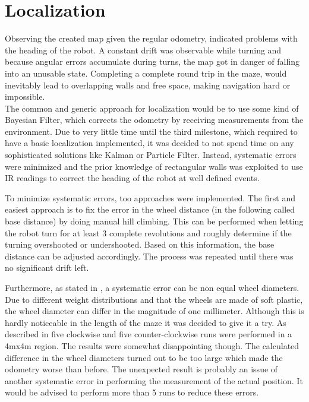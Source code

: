 \section{Localization}

Observing the created map given the regular odometry, indicated problems with the heading of the robot.
A constant drift was observable while turning and because angular errors accumulate during turns,
the map got in danger of falling into an unusable state.
Completing a complete round trip in the maze, would inevitably lead to overlapping walls and free space,
making navigation hard or impossible.\\

The common and generic approach for localization would be to use some kind of Bayesian Filter,
which corrects the odometry by receiving measurements from the environment.
Due to very little time until the third milestone, which required to have a basic localization implemented,
it was decided to not spend time on any sophisticated solutions like Kalman or Particle Filter.
Instead, systematic errors were minimized and the prior knowledge of rectangular walls was exploited to use IR readings to correct
the heading of the robot at well defined events.

To minimize systematic errors, too approaches were implemented.
The first and easiest approach is to fix the error in the wheel distance (in the following called base distance) by doing manual hill climbing.
This can be performed when letting the robot turn for at least 3 complete revolutions and roughly determine if the turning overshooted or undershooted.
Based on this information, the base distance can be adjusted accordingly.
The process was repeated until there was no significant drift left.

Furthermore, as stated in \cite{OdomCorr}, a systematic error can be non equal wheel diameters.
Due to different weight distributions and that the wheels are made of soft plastic, 
the wheel diameter can differ in the magnitude of one millimeter. 
Although this is hardly noticeable in the length of the maze it was decided to give it a try.
As described in \cite{OdomCorr} five clockwise and five counter-clockwise runs were performed in a 4mx4m region.
The results were somewhat disappointing though. 
The calculated difference in the wheel diameters turned out to be too large which made the odometry worse than before.
The unexpected result is probably an issue of another systematic error in performing the measurement of the actual position.
It would be advised to perform more than 5 runs to reduce these errors.

